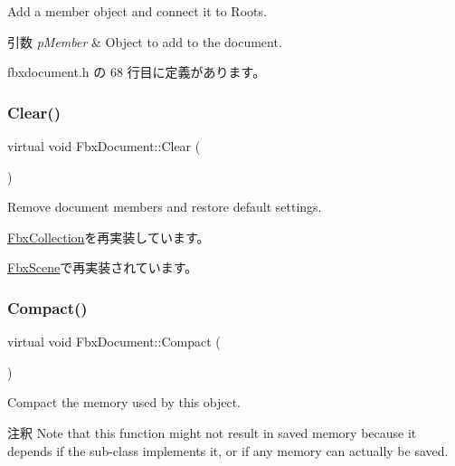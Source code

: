 Add a member object and connect it to Roots. 
\begin{DoxyParams}{引数}
{\em p\+Member} & Object to add to the document. \\
\hline
\end{DoxyParams}


 fbxdocument.\+h の 68 行目に定義があります。

\mbox{\label{class_fbx_document_ac8fa73e98a73c4f6637466e58d069bbe}} 
\subsubsection{\texorpdfstring{Clear()}{Clear()}}
{\footnotesize\ttfamily virtual void Fbx\+Document\+::\+Clear (\begin{DoxyParamCaption}{ }\end{DoxyParamCaption})\hspace{0.3cm}{\ttfamily [virtual]}}



Remove document members and restore default settings. 



\hyperlink{class_fbx_collection_a79ba35ab4693cd1b1c79a221d7d2f8d3}{Fbx\+Collection}を再実装しています。



\hyperlink{class_fbx_scene_ab578ff733eb8f6af89ff1645852966cd}{Fbx\+Scene}で再実装されています。

\mbox{\label{class_fbx_document_a62a41699423c0431a1e0969e9dea176d}} 
\subsubsection{\texorpdfstring{Compact()}{Compact()}}
{\footnotesize\ttfamily virtual void Fbx\+Document\+::\+Compact (\begin{DoxyParamCaption}{ }\end{DoxyParamCaption})\hspace{0.3cm}{\ttfamily [virtual]}}

Compact the memory used by this object. \begin{DoxyRemark}{注釈}
Note that this function might not result in saved memory because it depends if the sub-\/class implements it, or if any memory can actually be saved. 
\end{DoxyRemark}


